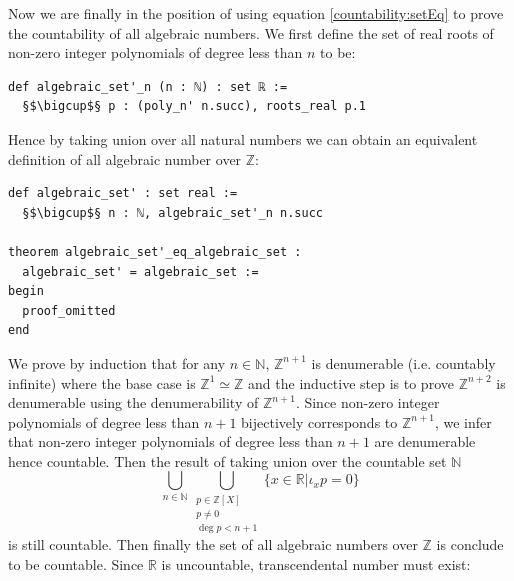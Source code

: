 \documentclass{report}
\theoremstyle{definition}
\begin{document}
Now we are finally in the position of using equation \ref{countability:setEq} to prove the countability of all algebraic numbers. We first define the set of real roots of non-zero integer polynomials of degree less than $n$ to be:
\begin{verbatim}
def algebraic_set'_n (n : ℕ) : set ℝ := 
  §$\bigcup$§ p : (poly_n' n.succ), roots_real p.1
\end{verbatim}
Hence by taking union over all natural numbers we can obtain an equivalent definition of all algebraic number over $\mathbb{Z}$:
\begin{verbatim}
def algebraic_set' : set real := 
  §$\bigcup$§ n : ℕ, algebraic_set'_n n.succ

theorem algebraic_set'_eq_algebraic_set : 
  algebraic_set' = algebraic_set :=
begin
  proof_omitted
end
\end{verbatim}
We prove by induction that for any $n\in\mathbb N$, $\mathbb{Z}^{n+1}$ is denumerable (i.e. countably infinite) where the base case is $\mathbb Z^1\simeq \mathbb Z$ and the inductive step is to prove $\mathbb{Z}^{n+2}$ is denumerable using the denumerability of $\mathbb{Z}^{n+1}$. Since non-zero integer polynomials of degree less than $n+1$ bijectively corresponds to $\mathbb{Z}^{n+1}$, we infer that non-zero integer polynomials of degree less than $n+1$ are denumerable hence countable. Then the result of taking union over the countable set $\mathbb N$
\begin{equation*}
\bigcup_{n\in\mathbb N}\bigcup_{\substack{p\in\mathbb{Z}[X]\\ p\ne 0\\ \deg{p}<n+1}} \{x\in\mathbb{R}|\iota_xp=0\}
\end{equation*}
is still countable. Then finally the set of all algebraic numbers over $\mathbb Z$ is conclude to be countable. Since $\mathbb R$ is uncountable, transcendental number must exist:
\end{document}
